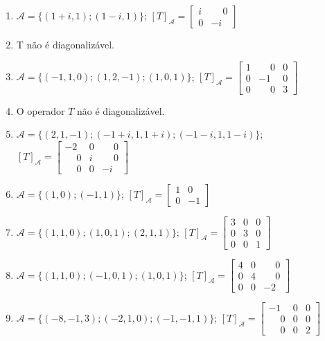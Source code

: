 \documentclass[12pt]{exam}
\begin{document}
\begin{exercicio}
\begin{solucao}
\begin{enumerate}[label=({\alph*})]
          \item $\mathcal{A} = \{(1 + i,1);(1 - i,1)\}$; $[T]_\mathcal{A} = \begin{bmatrix} i & \phantom{-} 0\\ 0 & -i\end{bmatrix}$
          \item T n\~ao \'e diagonaliz\'avel.
          \item $\mathcal{A} = \{(-1,1,0);(1,2,-1);(1,0,1)\}$; $[T]_\mathcal{A} = \begin{bmatrix} 1 & \phantom{-} 0 & 0\\ 0 & -1 & 0\\0 & \phantom{-} 0 & 3\end{bmatrix}$
          \item O operador $T$ n\~ao \'e diagonaliz\'avel.
          \item $\mathcal{A} = \{(2,1,-1);(-1 + i, 1, 1 + i);(-1 - i, 1, 1 - i)\}$; $[T]_\mathcal{A} = \begin{bmatrix} -2 & 0 & \phantom{-} 0\\ \phantom{-} 0 & i & \phantom{-} 0\\ \phantom{-} 0 & 0 & -i\end{bmatrix}$
          \item $\mathcal{A} = \{(1,0);(-1,1)\}$; $[T]_\mathcal{A} = \begin{bmatrix} 1 & 0\\ 0 & -1\end{bmatrix}$
          \item $\mathcal{A} = \{(1,1,0);(1,0,1);(2,1,1)\}$; $[T]_\mathcal{A} = \begin{bmatrix} 3 & 0 & 0\\ 0 & 3 & 0\\ 0 & 0 & 1\end{bmatrix}$
          \item $\mathcal{A} = \{(1,1,0);(-1,0,1);(1,0,1)\}$; $[T]_\mathcal{A} = \begin{bmatrix} 4 & 0 & \phantom{-} 0\\ 0 & 4 & \phantom{-} 0\\ 0 & 0 & -2\end{bmatrix}$
          \item $\mathcal{A} = \{(-8,-1,3);(-2,1,0);(-1,-1,1)\}$; $[T]_\mathcal{A} = \begin{bmatrix} -1 & 0 & 0\\ \phantom{-} 0 & 0 & 0\\ \phantom{-} 0 & 0 & 2\end{bmatrix}$

\end{enumerate}
\end{solucao}
\end{exercicio}
\end{document}
